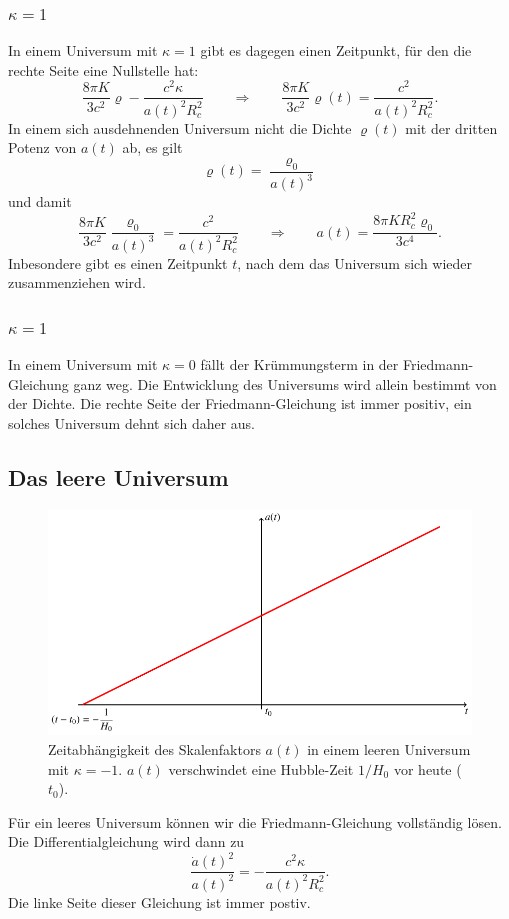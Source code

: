 \subsubsection{$\kappa=1$}
In einem Universum mit $\kappa=1$ gibt es dagegen einen Zeitpunkt, für
den die rechte Seite eine Nullstelle hat:
\[
\frac{8\pi K}{3c^2}\varrho -\frac{c^2\kappa}{a(t)^2R_c^2}
\qquad\Rightarrow\qquad
\frac{8\pi K}{3c^2}\varrho(t)=\frac{c^2}{a(t)^2R_c^2}.
\]
In einem sich ausdehnenden Universum nicht die Dichte $\varrho(t)$ mit
der dritten Potenz von $a(t)$ ab, es gilt
\[
\varrho(t) = \frac{\varrho_0}{a(t)^3}
\]
und damit
\[
\frac{8\pi K}{3c^2}\frac{\varrho_0}{a(t)^3}=\frac{c^2}{a(t)^2R_c^2}
\qquad\Rightarrow\qquad
a(t)
=
\frac{8\pi K R_c^2\varrho_0}{3c^4}.
\]
Inbesondere gibt es einen Zeitpunkt $t$, nach dem das Universum sich
wieder zusammenziehen wird.

\subsubsection{$\kappa=1$}
In einem Universum mit $\kappa=0$ fällt der Krümmungsterm in 
der Friedmann-Gleichung ganz weg.
Die Entwicklung des Universums wird allein bestimmt von der Dichte.
Die rechte Seite der Friedmann-Gleichung ist immer positiv, ein
solches Universum dehnt sich daher aus.

\subsection{Das leere Universum}
\begin{figure}
\centering
\includegraphics{chapters/tikz/friedmann-leer.pdf}
\caption{Zeitabhängigkeit des Skalenfaktors $a(t)$ in einem leeren
Universum mit $\kappa = -1$.
$a(t)$ verschwindet eine Hubble-Zeit $1/H_0$ vor heute ($t_0$).
\label{chapter:friedmann:graph:leer}}
\end{figure}
Für ein leeres Universum können wir die Friedmann-Gleichung vollständig
lösen.
Die Differentialgleichung wird dann zu
\[
\frac{\dot a(t)^2}{a(t)^2}
=
-\frac{c^2\kappa}{a(t)^2R_c^2}.
\]
Die linke Seite dieser Gleichung ist immer postiv.

